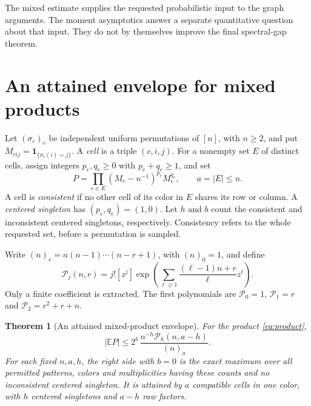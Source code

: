 \documentclass[11pt]{article}
\newtheorem{theorem}{Theorem}[section]
\theoremstyle{definition}
\theoremstyle{remark}
\newcommand{\E}{\mathbb E}
\newcommand{\1}{\mathbf 1}
\begin{document}
The mixed estimate supplies the requested probabilistic input to the graph arguments. The moment asymptotics answer a separate quantitative question about that input. They do not by themselves improve the final spectral-gap theorem.


\section{An attained envelope for mixed products}\label{sec:mixed}

Let $(\sigma_c)_c$ be independent uniform permutations of $[n]$, with $n\ge2$, and put $M_{cij}=\1_{\{\sigma_c(i)=j\}}$. A \emph{cell} is a triple $(c,i,j)$. For a nonempty set $E$ of distinct cells, assign integers $p_e,q_e\ge0$ with $p_e+q_e\ge1$, and set
\begin{equation}\label{eq:product}
P=\prod_{e\in E}(M_e-n^{-1})^{p_e}M_e^{q_e},\qquad a=|E|\le n.
\end{equation}
A cell is \emph{consistent} if no other cell of its color in $E$ shares its row or column. A \emph{centered singleton} has $(p_e,q_e)=(1,0)$. Let $h$ and $b$ count the consistent and inconsistent centered singletons, respectively. Consistency refers to the whole requested set, before a permutation is sampled.

Write $(n)_r=n(n-1)\cdots(n-r+1)$, with $(n)_0=1$, and define
\begin{equation}\label{eq:depletedpoly}
\mathcal P_j(n,r)
=j![z^j]\exp\left(\sum_{\ell\ge1}
\frac{(\ell-1)n+r}{\ell}z^\ell\right).
\end{equation}
Only a finite coefficient is extracted. The first polynomials are
$\mathcal P_0=1$, $\mathcal P_1=r$ and $\mathcal P_2=r^2+r+n$.

\begin{theorem}[An attained mixed-product envelope]\label{thm:mixed}
For the product \eqref{eq:product},
\begin{equation}\label{eq:mixedexact}
|\E P|\le 2^b\,\frac{n^{-h}\mathcal P_h(n,a-h)}{(n)_a}.
\end{equation}
For each fixed $n,a,h$, the right side with $b=0$ is the exact maximum over all permitted patterns, colors and multiplicities having these counts and no inconsistent centered singleton. It is attained by $a$ compatible cells in one color, with $h$ centered singletons and $a-h$ raw factors.
\end{theorem}
\end{document}
